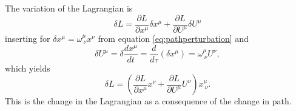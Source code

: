 \documentclass[11pt]{amsart}
\begin{document}
The variation of the Lagrangian is
\begin{equation*}
\delta L = \frac{\partial L}{\partial x^\mu} \delta x^\mu + \frac{\partial L}{\partial U^\mu} \delta U^\mu
\end{equation*}
inserting for $\delta x^\mu = \omega^\mu_{\ \nu} x^\nu$ from equation \ref{eq:pathperturbation} and 
\begin{equation*}
\delta U^\mu = \delta \frac{d x^\mu}{d t} = \frac{d}{d\tau}(\delta x^\mu) = \omega^\mu_{\ \nu}U^\nu, 
\end{equation*} 
which yields
\begin{equation}
\label{eq:lagrangeperturbartion}
\delta L = \left(\frac{\partial L}{\partial x^\mu}x^\nu + \frac{\partial L}{\partial U^\mu}U^\nu \right)x^\mu_{\ \nu}.
\end{equation}
This is the change in the Lagrangian as a consequence of the change in path.
\end{document}
